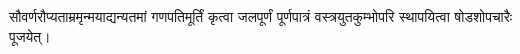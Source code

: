 



\begingroup
\renewcommand{\devaName}{देव}

\endgroup








\renewcommand{\devaH}{श्री-सिद्धिविनायकः}
\label{sec:start_chaturthi_puja}

सौवर्णरौप्यताम्रमृन्मयाद्यन्यतमां गणपतिमूर्तिं कृत्वा जलपूर्णं पूर्णपात्रं वस्त्रयुतकुम्भोपरि स्थापयित्वा
षोडशोपचारैः पूजयेत्।

\renewcommand{\devAya}{श्री-सिद्धिविनायकाय नमः,}
